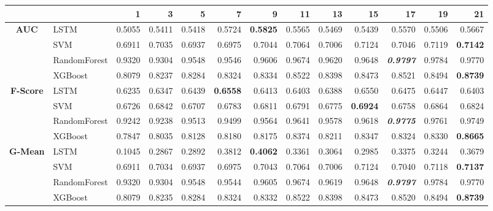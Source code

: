 \begin{table}[H]
	\centering
	\begin{adjustbox}{max width=12cm}
		\begin{tabular}{|c|l|r|r|r|r|r|r|r|r|r|r|r|}
			\hline
			&         &      1  &      3  &      5  &      7  &      9  &      11 &      13 &      15 &      17 &      19 &      21 \\
			\hline
			\textbf{AUC} &  LSTM &  0.5055 &  0.5411 &  0.5418 &  0.5724 & \textbf{  0.5825 } &  0.5565 &  0.5469 &  0.5439 &  0.5570 &  0.5506 &  0.5667 \\
			&  SVM &  0.6911 &  0.7035 &  0.6937 &  0.6975 &  0.7044 &  0.7064 &  0.7006 &  0.7124 &  0.7046 &  0.7119 & \textbf{  0.7142 } \\
			&  RandomForest &  0.9320 &  0.9304 &  0.9548 &  0.9546 &  0.9606 &  0.9674 &  0.9620 &  0.9648 & \textit{ \textbf{  0.9797 } } &  0.9784 &  0.9770 \\
			&  XGBoost &  0.8079 &  0.8237 &  0.8284 &  0.8324 &  0.8334 &  0.8522 &  0.8398 &  0.8473 &  0.8521 &  0.8494 & \textbf{  0.8739 } \\			
			\hline
			\textbf{F-Score} &  LSTM &  0.6235 &  0.6347 &  0.6439 & \textbf{  0.6558 } &  0.6413 &  0.6403 &  0.6388 &  0.6550 &  0.6475 &  0.6447 &  0.6403 \\
			&  SVM &  0.6726 &  0.6842 &  0.6707 &  0.6783 &  0.6811 &  0.6791 &  0.6775 & \textbf{  0.6924 } &  0.6758 &  0.6864 &  0.6824 \\
			&  RandomForest &  0.9242 &  0.9238 &  0.9513 &  0.9499 &  0.9564 &  0.9641 &  0.9578 &  0.9618 & \textit{ \textbf{  0.9775 } } &  0.9761 &  0.9749 \\
			&  XGBoost &  0.7847 &  0.8035 &  0.8128 &  0.8180 &  0.8175 &  0.8374 &  0.8211 &  0.8347 &  0.8324 &  0.8330 & \textbf{  0.8665 } \\			
			\hline
			\textbf{G-Mean} &  LSTM &  0.1045 &  0.2867 &  0.2892 &  0.3812 & \textbf{  0.4062 } &  0.3361 &  0.3064 &  0.2985 &  0.3375 &  0.3244 &  0.3679 \\
			&  SVM &  0.6911 &  0.7034 &  0.6937 &  0.6975 &  0.7043 &  0.7064 &  0.7006 &  0.7124 &  0.7040 &  0.7118 & \textbf{  0.7137 } \\
			&  RandomForest &  0.9320 &  0.9304 &  0.9548 &  0.9544 &  0.9605 &  0.9674 &  0.9619 &  0.9648 & \textit{ \textbf{  0.9797 } } &  0.9784 &  0.9770 \\
			&  XGBoost &  0.8079 &  0.8235 &  0.8284 &  0.8324 &  0.8332 &  0.8522 &  0.8398 &  0.8473 &  0.8520 &  0.8494 & \textbf{  0.8739 } \\			

\end{tabular}
\end{adjustbox}
\end{table}
